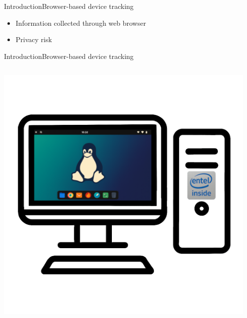 \documentclass[aspectratio=169, hyperref={colorlinks=true, allcolors=SecondaryColor}, c]{beamer}
\begin{document}
\begin{frame}[fragile]{Introduction}{Browser-based device tracking}
\begin{transformation}
\begin{adjustbox}{scale=1}
\begin{minipage}{1\textwidth}
			\end{minipage}
		\end{adjustbox}
	\end{transformation}
	\vspace{-0.5cm}
	\begin{itemize}
		\item Information collected through web browser
		\item Privacy risk
	\end{itemize}
\end{frame}

\begin{frame}[fragile]{Introduction}{Browser-based device tracking}
	\begin{columns}
		\begin{column}{0.33\textwidth}
			\includegraphics[width=1\textwidth]{./figures/computer_alpha_screen_2_golden.png}
		\end{column}
		\begin{column}{0.33\textwidth}

\end{column}
\end{columns}
\end{frame}
\end{document}
